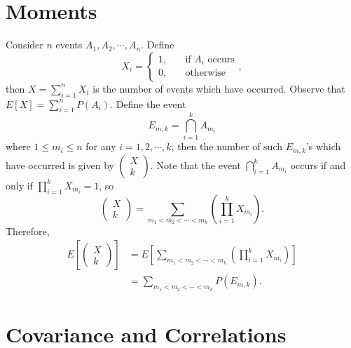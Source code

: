 \documentclass[math]{amznotes}
\theoremstyle{remark}
\begin{document}
\section{Moments}
Consider $n$ events $A_1, A_2, \cdots, A_n$. Define
\begin{equation*}
    X_i = \begin{cases}
        1, & \quad\textrm{if } A_i \textrm{ occurs} \\
        0, & \quad\textrm{otherwise}
    \end{cases},
\end{equation*}
then $X = \sum_{i = 1}^{n}X_i$ is the number of events which have occurred. Observe that $E[X] = \sum_{i = 1}^{n}P(A_i)$. Define the event
\begin{equation*}
    E_{m, k} = \bigcap_{i = 1}^{k}A_{m_i}
\end{equation*}
where $1 \leq m_i \leq n$ for any $i = 1, 2, \cdots, k$, then the number of such $E_{m, k}$'s which have occurred is given by $\left(\begin{smallmatrix}
    X \\
    k
\end{smallmatrix}\right)$. Note that the event $\bigcap_{i = 1}^{k}A_{m_i}$ occurs if and only if $\prod_{i = 1}^{k}X_{m_i} = 1$, so
\begin{equation*}
    \begin{pmatrix}
        X \\
        k
    \end{pmatrix} = \sum_{m_1 < m_2 < \cdots < m_k}\left(\prod_{i = 1}^{k}X_{m_i}\right).
\end{equation*}
Therefore, 
\begin{align*}
    E\left[\begin{pmatrix}
        X \\
        k
    \end{pmatrix}\right] & = E\left[\sum_{m_1 < m_2 < \cdots < m_k}\left(\prod_{i = 1}^{k}X_{m_i}\right)\right] \\
    & = \sum_{m_1 < m_2 < \cdots < m_k}P\left(E_{m, k}\right).
\end{align*}

\section{Covariance and Correlations}
\end{document}
